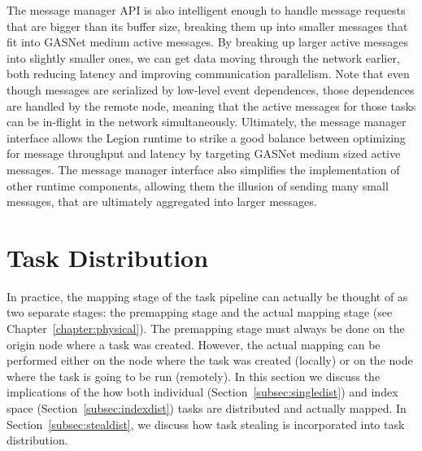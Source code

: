 The message manager API is also intelligent 
enough to handle message requests that are bigger 
than its buffer size, breaking them up into smaller 
messages that fit into GASNet medium active
messages. By breaking up larger active messages
into slightly smaller ones, we can get data
moving through the network earlier, both reducing
latency and improving communication parallelism.
Note that even though messages are serialized
by low-level event dependences, those dependences
are handled by the remote node, meaning that the
active messages for those tasks can be in-flight
in the network simultaneously. Ultimately, the
message manager interface allows the Legion runtime
to strike a good balance between optimizing for
message throughput and latency by targeting 
GASNet medium sized active messages. The message manager 
interface also simplifies the implementation of other
runtime components, allowing them the illusion
of sending many small messages, that are ultimately
aggregated into larger messages.

\section{Task Distribution}
\label{sec:taskdist}
In practice, the mapping stage of the task pipeline
can actually be thought of as two separate
stages: the premapping stage and the actual 
mapping stage (see Chapter~\ref{chapter:physical}).
The premapping stage must always be done on the
origin node where a task was created. However, the
actual mapping can be performed either on the 
node where the task was created (locally) or on
the node where the task is going to be run (remotely).
In this section we discuss the implications of the
how both individual (Section~\ref{subsec:singledist})
and index space (Section~\ref{subsec:indexdist}) tasks
are distributed and actually mapped. In 
Section~\ref{subsec:stealdist}, we discuss how task
stealing is incorporated into task distribution.

